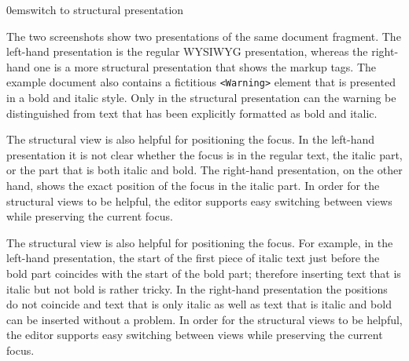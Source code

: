 \documentclass{speauth}
\begin{document}
{0em}{\small switch to structural presentation}


The two screenshots show two presentations of the same document fragment. The left-hand presentation is the regular WYSIWYG presentation, whereas the right-hand one is a more structural presentation that shows the markup tags. The example document also contains a fictitious \verb|<Warning>| element that is presented in a bold and italic style. Only in the structural presentation can the warning be distinguished from text that has been explicitly formatted as bold and italic.

The structural view is also helpful for positioning the focus. In the left-hand presentation it is not clear whether the focus is in the regular text, the italic part, or the part that is both italic and bold. The right-hand presentation, on the other hand, shows the exact position of the focus in the italic part. In order for the structural views to be helpful, the editor supports easy switching between views while preserving the current focus.

\bc
The structural view is also helpful for positioning the focus. For example, in the left-hand presentation, the start of the first piece of italic text just before the bold part coincides with the start of the bold part; therefore inserting text that is italic but not bold is rather tricky. In the right-hand presentation the positions do not coincide and text that is only italic as well as text that is italic and bold can be inserted without a problem. In order for the structural views to be helpful, the editor supports easy switching between views while preserving the current focus.
\ec
\end{document}
